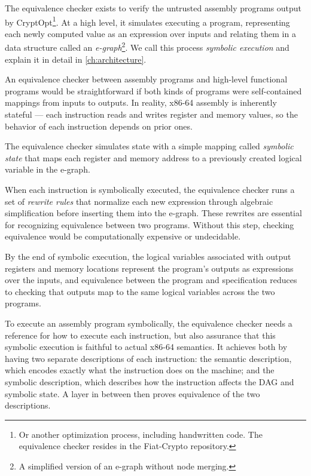 The equivalence checker exists to verify the untrusted assembly programs output by CryptOpt\footnote{Or another optimization process, including handwritten code. The equivalence checker resides in the Fiat-Crypto repository.}. At a high level, it simulates executing a program, representing each newly computed value as an expression over inputs and relating them in a data structure called an \emph{e-graph}\footnote{A simplified version of an e-graph without node merging.}. We call this process \emph{symbolic execution} and explain it in detail in \autoref{ch:architecture}.

An equivalence checker between assembly programs and high-level functional programs would be straightforward if both kinds of programs were self-contained mappings from inputs to outputs. In reality, x86-64 assembly is inherently stateful --- each instruction reads and writes register and memory values, so the behavior of each instruction depends on prior ones.

The equivalence checker simulates state with a simple mapping called \emph{symbolic state} that maps each register and memory address to a previously created logical variable in the e-graph. 

When each instruction is symbolically executed, the equivalence checker runs a set of \emph{rewrite rules} that normalize each new expression through algebraic simplification before inserting them into the e-graph.
These rewrites are essential for recognizing equivalence between two programs. 
Without this step, checking equivalence would be computationally expensive or undecidable.

By the end of symbolic execution, the logical variables associated with output registers and memory locations represent the program's outputs as expressions over the inputs, and equivalence between the program and specification reduces to checking that outputs map to the same logical variables across the two programs.

To execute an assembly program symbolically, the equivalence checker needs a reference for how to execute each instruction, but also assurance that this symbolic execution is faithful to actual x86-64 semantics.
It achieves both by having two separate descriptions of each instruction: the semantic description, which encodes exactly what the instruction does on the machine; and the symbolic description, which describes how the instruction affects the DAG and symbolic state.
A layer in between then proves equivalence of the two descriptions.

